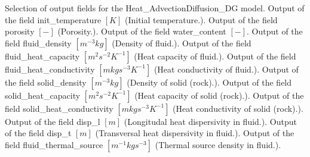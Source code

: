 \begin{SelectionType}
	{}
	{{{Selection of output fields for the Heat{\_}AdvectionDiffusion{\_}DG model.}}}
		\KeyItem
			{}
			{{{Output of the field init{\_}temperature }{$[K]$}{ (Initial temperature.).}}}
		\KeyItem
			{}
			{{{Output of the field porosity }{$[-]$}{ (Porosity.).}}}
		\KeyItem
			{}
			{{{Output of the field water{\_}content }{$[-]$}{.}}}
		\KeyItem
			{}
			{{{Output of the field fluid{\_}density }{$[m^{-3}kg]$}{ (Density of fluid.).}}}
		\KeyItem
			{}
			{{{Output of the field fluid{\_}heat{\_}capacity }{$[m^{2}s^{-2}K^{-1}]$}{ (Heat capacity of fluid.).}}}
		\KeyItem
			{}
			{{{Output of the field fluid{\_}heat{\_}conductivity }{$[mkgs^{-3}K^{-1}]$}{ (Heat conductivity of fluid.).}}}
		\KeyItem
			{}
			{{{Output of the field solid{\_}density }{$[m^{-3}kg]$}{ (Density of solid (rock).).}}}
		\KeyItem
			{}
			{{{Output of the field solid{\_}heat{\_}capacity }{$[m^{2}s^{-2}K^{-1}]$}{ (Heat capacity of solid (rock).).}}}
		\KeyItem
			{}
			{{{Output of the field solid{\_}heat{\_}conductivity }{$[mkgs^{-3}K^{-1}]$}{ (Heat conductivity of solid (rock).).}}}
		\KeyItem
			{}
			{{{Output of the field disp{\_}l }{$[m]$}{ (Longitudal heat dispersivity in fluid.).}}}
		\KeyItem
			{}
			{{{Output of the field disp{\_}t }{$[m]$}{ (Transversal heat dispersivity in fluid.).}}}
		\KeyItem
			{}
			{{{Output of the field fluid{\_}thermal{\_}source }{$[m^{-1}kgs^{-3}]$}{ (Thermal source density in fluid.).}}}

\end{SelectionType}
